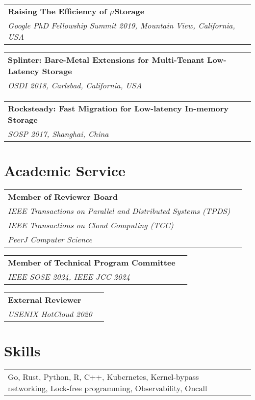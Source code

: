 \documentclass[margin,line]{res}
\begin{document}
\begin{resume}
\vspace{-7pt}
\begin{tabular}{@{}p{5.5in}p{4in}}
{\bf Raising The Efficiency of $\mu$Storage}\\
{\small\em Google PhD Fellowship Summit 2019, Mountain View, California,
USA}\\
\end{tabular}

\vspace{-7pt}
\begin{tabular}{@{}p{5.5in}p{4in}}
{\bf Splinter: Bare-Metal Extensions for Multi-Tenant Low-Latency Storage}\\
{\small\em OSDI 2018, Carlsbad, California, USA}\\
\end{tabular}

\vspace{-7pt}
\begin{tabular}{@{}p{5.5in}p{4in}}
{\bf Rocksteady: Fast Migration for Low-latency In-memory Storage}\\
{\small\em SOSP 2017, Shanghai, China}\\
\end{tabular}

\section{\sc Academic Service}
\begin{tabular}{@{}p{5.5in}p{4in}}
{\bf Member of Reviewer Board}\\
{\small\em IEEE Transactions on Parallel and Distributed Systems (TPDS)}\\
{\small\em IEEE Transactions on Cloud Computing (TCC)}\\
{\small\em PeerJ Computer Science}\\
\end{tabular}

\vspace{-7pt}
\begin{tabular}{@{}p{5.5in}p{4in}}
{\bf Member of Technical Program Committee}\\
{\small\em IEEE SOSE 2024, IEEE JCC 2024}\\
\end{tabular}

\vspace{-7pt}
\begin{tabular}{@{}p{5.5in}p{4in}}
{\bf External Reviewer}\\
{\small\em USENIX HotCloud 2020}\\
\end{tabular}

\section{\sc Skills}
\begin{tabular}{@{}p{5.5in}p{4in}}
Go, Rust, Python, R, C++, Kubernetes, Kernel-bypass networking,
Lock-free programming, Observability, Oncall
\end{tabular}

\end{resume}
\end{document}
